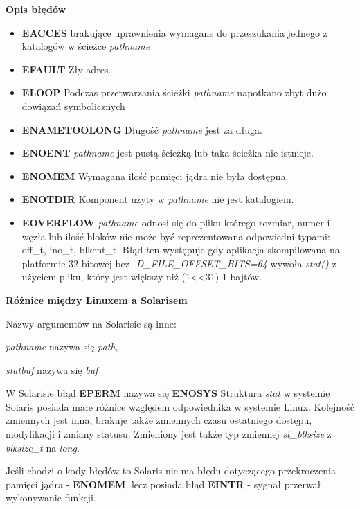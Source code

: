 \documentclass{article}
\begin{document}
\textbf{Opis błędów}
\begin{itemize}
\item \textbf{EACCES} brakujące uprawnienia wymagane do przeszukania jednego z katalogów w ścieżce \textit{pathname}
\item \textbf{EFAULT} Zły adres.
\item \textbf{ELOOP} Podczas przetwarzania ścieżki \textit{pathname} napotkano zbyt dużo dowiązań symbolicznych
\item \textbf{ENAMETOOLONG} Długość \textit{pathname} jest za długa.
\item \textbf{ENOENT} \textit{pathname} jest pustą ścieżką lub taka ścieżka nie istnieje.

\item \textbf{ENOMEM}  Wymagana ilość pamięci jądra nie była dostępna.
\item \textbf{ENOTDIR}  Komponent użyty w \textit{pathname} nie jest katalogiem.
\item \textbf{EOVERFLOW} \textit{pathname} odnosi się do pliku którego rozmiar, numer i-węzła lub ilość bloków nie może być reprezentowana odpowiedni typami: off\_t, ino\_t, blkcnt\_t. Błąd ten występuje gdy aplikacja skompilowana na platformie 32-bitowej bez \textit{-D\_FILE\_OFFSET\_BITS=64} wywoła \textit{stat()} z użyciem pliku, który jest większy niż (1<<31)-1 bajtów.



\end{itemize}
\textbf{Różnice między Linuxem a Solarisem}


Nazwy argumentów na Solarisie są inne:

\textit{pathname} nazywa się \textit{path},

\textit{statbuf} nazywa się \textit{buf}

W Solarisie  błąd \textbf{EPERM} nazywa się \textbf{ENOSYS}
Struktura \textit{stat} w systemie Solaris posiada małe różnice względem odpowiednika w systemie Linux.
Kolejność zmiennych jest inna, brakuje także zmiennych czasu ostatniego dostępu, modyfikacji i zmiany statusu.
Zmieniony jest także typ zmiennej \textit{st\_blksize} z \textit{blksize\_t} na \textit{long}.

Jeśli chodzi o kody błędów to Solaris nie ma błędu dotyczącego przekroczenia pamięci jądra - \textbf{ENOMEM}, lecz posiada błąd \textbf{EINTR} - sygnał przerwał wykonywanie funkcji.
\end{document}
